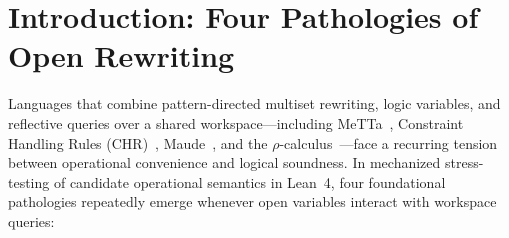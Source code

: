 \documentclass[11pt,a4paper]{article}
\theoremstyle{definition}
\begin{document}
\tableofcontents
\newpage

\section{Introduction: Four Pathologies of Open Rewriting}
\label{sec:intro}

Languages that combine pattern-directed multiset rewriting, logic variables, and reflective queries over a shared workspace---including MeTTa~\cite{Goertzel2023MeTTa}, Constraint Handling Rules (CHR)~\cite{Fruhwirth2009CHR}, Maude~\cite{Meseguer1992Conditional}, and the $\rho$-calculus~\cite{MeredithRadestock2005Rho}---face a recurring tension between operational convenience and logical soundness. In mechanized stress-testing of candidate operational semantics in Lean~4, four foundational pathologies repeatedly emerge whenever open variables interact with workspace queries:
\end{document}
